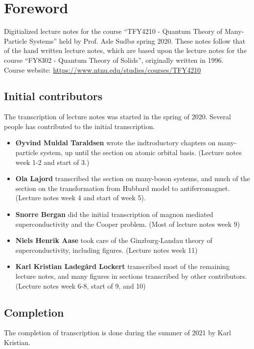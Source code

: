 \section*{Foreword}

Digitialized lecture notes for the course ``TFY4210 - Quantum Theory of Many-Particle Systems'' held by Prof. Asle Sudbø spring 2020. These notes follow that of the hand written lecture notes, which are based upon the lecture notes for the course ``FY8302 - Quantum Theory of Solids'', originally written in 1996. \\
Course website: \href{https://www.ntnu.edu/studies/courses/TFY4210}{https://www.ntnu.edu/studies/courses/TFY4210}



\subsection*{Initial contributors}

The transcription of lecture notes was started in the spring of 2020. Several people has contributed to the initial transcription. 
\begin{itemize} 
	\item \textbf{Øyvind Muldal Taraldsen} wrote the indtroductory chapters on many-particle system, up until the section on atomic orbital basis. (Lecture notes week 1-2 and start of 3.)
	\item \textbf{Ola Lajord} transcribed the section on many-boson systems, and much of the section on the transformation from Hubbard model to antiferromagnet. (Lecture notes week 4 and start of week 5).
	\item \textbf{Snorre Bergan} did the initial transcription of magnon mediated superconductivity and the Cooper problem. (Most of lecture notes week 9)
	\item \textbf{Niels Henrik Aase} took care of the Ginzburg-Landau theory of superconductivity, including figures. (Lecture notes week 11)
	\item \textbf{Karl Kristian Ladegård Lockert} transcribed most of the remaining lecture notes, and many figures in sections transcribed by other contributors. (Lecture notes week 6-8, start of 9, and 10)
\end{itemize}

\subsection*{Completion}
The completion of transcription is done during the summer of 2021 by Karl Kristian.

